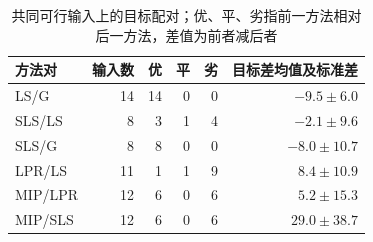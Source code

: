 \begin{table}[htbp]
\centering\small
\caption{共同可行输入上的目标配对；优、平、劣指前一方法相对后一方法，差值为前者减后者}\label{tab:paired}
\begin{tabular}{lrrrrr}\toprule
方法对 & 输入数 & 优 & 平 & 劣 & 目标差均值及标准差 \\\midrule
LS/G & 14 & 14 & 0 & 0 & $-9.5\pm6.0$ \\
SLS/LS & 8 & 3 & 1 & 4 & $-2.1\pm9.6$ \\
SLS/G & 8 & 8 & 0 & 0 & $-8.0\pm10.7$ \\
LPR/LS & 11 & 1 & 1 & 9 & $8.4\pm10.9$ \\
MIP/LPR & 12 & 6 & 0 & 6 & $5.2\pm15.3$ \\
MIP/SLS & 12 & 6 & 0 & 6 & $29.0\pm38.7$ \\
\bottomrule\end{tabular}
\end{table}

